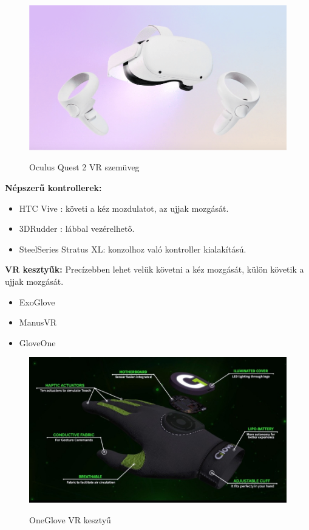 \begin{figure}[htp]
    \centering
   	\includegraphics[width=5truecm, height=3.8truecm]{images/oculus.png}
	\caption{Oculus Quest 2 VR szemüveg }
	\cite{occulus}
\end{figure}


{\bf Népszerű kontrollerek:}
\begin{itemize}
\item HTC Vive : követi a kéz mozdulatot, az ujjak mozgását.
\item 3DRudder : lábbal vezérelhető.
\item SteelSeries Stratus XL: konzolhoz való kontroller kialakítású.\cite{kontroller}
\end{itemize}

{\bf VR kesztyűk:}
Precízebben lehet velük követni a kéz mozgását, külön követik a ujjak mozgását.
\begin{itemize}
\item ExoGlove
\item ManusVR
\item GloveOne
\end{itemize}

\begin{figure}[htp]
    \centering
   	\includegraphics[width=5truecm, height=3.8truecm]{images/gloveone.jpg}
	\caption{OneGlove VR kesztyű}
	\cite{gloveOne}
\end{figure}

